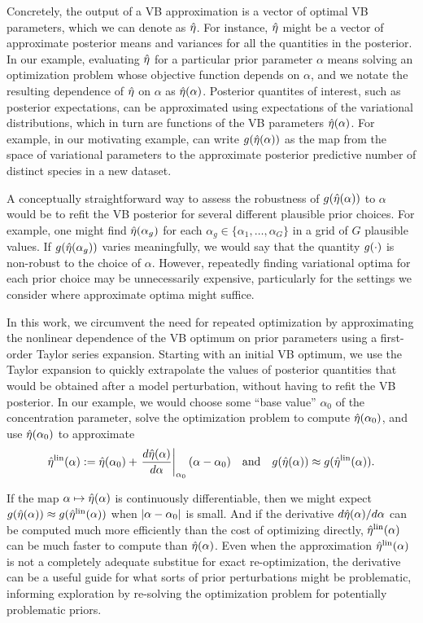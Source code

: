 Concretely, the output of a VB approximation is a vector of optimal VB
parameters, which we can denote as $\hat\eta$.  For instance, $\hat\eta$ might be
a vector of approximate posterior means and variances for all the quantities in
the posterior.  In our example, evaluating $\hat\eta$ for a particular prior
parameter $\alpha$ means solving an optimization problem whose objective
function depends on $\alpha$, and we notate the resulting dependence of
$\hat\eta$ on $\alpha$ as $\hat\eta(\alpha)$.
%
Posterior quantites of interest, such as posterior expectations,
can be approximated using expectations of the variational distributions, which
in turn are functions of the VB parameters $\hat\eta(\alpha)$. For example, in
our motivating example, can write $g(\hat\eta(\alpha))$ as the map from the
space of variational parameters to the approximate posterior predictive number
of distinct species in a new dataset.

A conceptually straightforward way to assess the robustness of
$g(\hat\eta(\alpha))$ to $\alpha$ would be to refit the VB posterior for several
different plausible prior choices.  For example, one might find
$\hat\eta(\alpha_g)$ for each $\alpha_g \in \{\alpha_1, \ldots, \alpha_G \}$ in a
grid of $G$ plausible values.  If $g(\hat\eta(\alpha_g))$ varies meaningfully,
we would say that the quantity $g(\cdot)$ is non-robust to the choice of
$\alpha$.  However, repeatedly finding variational optima for each prior choice
may be unnecessarily expensive, particularly for the settings we consider where
approximate optima might suffice.

In this work, we circumvent the need for repeated optimization by approximating
the nonlinear dependence of the VB optimum on prior parameters using a
first-order Taylor series expansion.  Starting with an initial VB optimum, we
use the Taylor expansion to quickly extrapolate the values of posterior
quantities that would be obtained after a model perturbation, without having to
refit the VB posterior.  In our example, we would choose some ``base value''
$\alpha_0$ of the concentration parameter, solve the optimization problem to
compute $\hat\eta(\alpha_0)$, and use $\hat\eta(\alpha_0)$ to approximate
%
\begin{align*}
%
\etalin(\alpha) :=
    \etaopt(\alpha_0) +
    \fracat{d\etaopt(\alpha)}{d\alpha}{\alpha_0} (\alpha - \alpha_0)
\mathand
g(\etaopt(\alpha)) \approx g(\etalin(\alpha)).
%
\end{align*}

If the map $\alpha \mapsto \hat\eta(\alpha)$ is continuously differentiable, then
we might expect $g(\hat\eta(\alpha)) \approx g(\hat\eta^{\mathrm{lin}}(\alpha))$ when
$\left|\alpha - \alpha_0\right|$ is small.  And if the derivative $d\hat\eta(\alpha) /
d\alpha$ can be computed much more efficiently than the cost of optimizing
directly, $\hat\eta^{\mathrm{lin}}(\alpha)$ can be much faster to compute than
$\hat\eta(\alpha)$.  Even when the approximation $\hat\eta^{\mathrm{lin}}(\alpha)$ is not a
completely adequate substitue for exact re-optimization, the derivative can be a
useful guide for what sorts of prior perturbations might be problematic,
informing exploration by re-solving the optimization problem for potentially
problematic priors.

